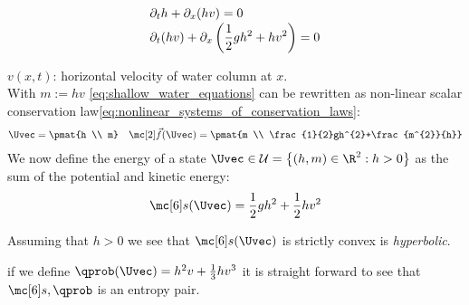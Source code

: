 \begin{examplebox}\nospacing
    \begin{example}
        \label{example:shallow_water_equations_entropy_pair}\leavevmode\\
        \begin{minipage}{0.55\textwidth}
            \begin{align}
              &\partial_{t}h+\partial_{x}(hv)=0\nonumber \\[-1\jot]
              &\partial_{t}(hv)+\partial_{x}\left(\frac{1}{2}gh^{2}+hv^{2}\right)=0\label{eq:shallow_water_equations}
            \end{align}
        \end{minipage}\hfill
        \begin{minipage}[c]{0.38\textwidth}
            \begin{figure}[H]
                \centering{
                  \def\svgwidth{100pt}
                  \resizebox{\linewidth}{!}{}
                }
            \end{figure}
        \end{minipage}
        $v(x,t)$: horizontal velocity of water column at $x$.\\
        With $m:=hv$ \cref{eq:shallow_water_equations} can be rewritten as non-linear scalar conservation law\cref{eq:nonlinear_systems_of_conservation_laws}:
        \begin{align}
          \Uvec=\pmat{h \\ m}&&\fluxvec(\Uvec)=\pmat{m \\ \frac{1}{2}gh^{2}+\frac{m^{2}}{h}}
        \end{align}
        We now define the energy of a state $\Uvec\in\admissibleset=\left\{(h,m)\in\R^{2}:h>0\right\}$ as the sum of the potential and kinetic energy:
        \begin{align*}
          \entropy(\Uvec)=\frac{1}{2}gh^{2}+\frac{1}{2}hv^{2}
        \end{align*}
        \begin{itemizenosep}
        \item Assuming that $h>0$ we see that $\entropy(\Uvec)$ is strictly convex
        is \textit{hyperbolic}.
        \item if we define $\qprob(\Uvec)=h^{2}v+\frac{1}{3}hv^{3}$ it is straight forward to see that $\entropy,\qprob$ is an entropy pair.
        \end{itemizenosep}
    \end{example}
\end{examplebox}
